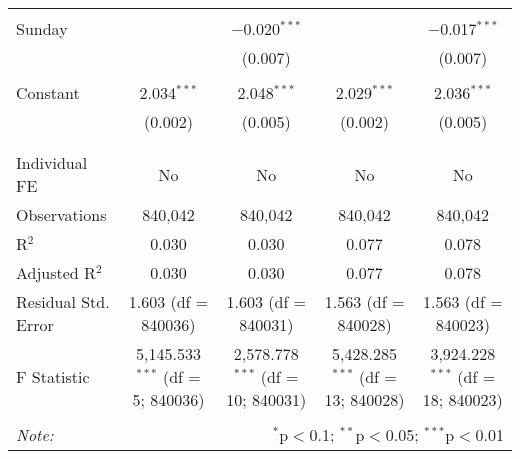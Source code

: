 \documentclass[
]{article}
\begin{document}
\begin{table}[!htbp]
{\begin{tabular}{@{\extracolsep{5pt}}lcccc}
  & & & & \\ 
 Sunday &  & $-$0.020$^{***}$ &  & $-$0.017$^{***}$ \\ 
  &  & (0.007) &  & (0.007) \\ 
  & & & & \\ 
 Constant & 2.034$^{***}$ & 2.048$^{***}$ & 2.029$^{***}$ & 2.036$^{***}$ \\ 
  & (0.002) & (0.005) & (0.002) & (0.005) \\ 
  & & & & \\ 
\hline \\[-1.8ex] 
Individual FE & No & No & No & No \\ 
Observations & 840,042 & 840,042 & 840,042 & 840,042 \\ 
R$^{2}$ & 0.030 & 0.030 & 0.077 & 0.078 \\ 
Adjusted R$^{2}$ & 0.030 & 0.030 & 0.077 & 0.078 \\ 
Residual Std. Error & 1.603 (df = 840036) & 1.603 (df = 840031) & 1.563 (df = 840028) & 1.563 (df = 840023) \\ 
F Statistic & 5,145.533$^{***}$ (df = 5; 840036) & 2,578.778$^{***}$ (df = 10; 840031) & 5,428.285$^{***}$ (df = 13; 840028) & 3,924.228$^{***}$ (df = 18; 840023) \\ 
\hline 
\hline \\[-1.8ex] 
\textit{Note:}  & \multicolumn{4}{r}{$^{*}$p$<$0.1; $^{**}$p$<$0.05; $^{***}$p$<$0.01} \\ 
\end{tabular}
} 
\end{table} 
\newpage
\end{document}
